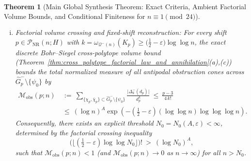 \documentclass[11pt, a4paper]{article}
\theoremstyle{plain}
\newtheorem{theorem}{Theorem}[section]
\theoremstyle{definition}
\begin{document}
\begin{theorem}[Main Global Synthesis Theorem: Exact Criteria, Ambient Factorial Volume Bounds, and Conditional Finiteness for $n\equiv1\pmod{24}$]
\begin{enumerate}[(a)]
\begin{enumerate}[(i)]
        \item \emph{Factorial volume crossing and fixed-shift reconstruction:} For every shift $p\in\mathcal{P}_{\mathrm{NR}}(n;H)$ with $k=\omega_{\mathcal{Q}^{-}(n)}(K_p)\ge\big(\frac12-\varepsilon\big)\log\log n$, the exact discrete Bohr--Siegel cross-polytope volume bound (Theorem~\ref{thm:cross_polytope_factorial_law_and_annihilation}(a),(c)) bounds the total normalized measure of all antipodal obstruction cones across $\widehat{G}_p^{-}\setminus\{\psi_0\}$ by
        \begin{equation}\label{eq:main_synthesis_factorial_threshold}
        \begin{split}
        \mathcal{M}_{\mathrm{obs}}(p;n)\ &:=\ \sum_{\{\chi_p,\overline{\chi}_p\}\subset\widehat{G}_p^{-}\setminus\{\psi_0\}}\frac{\big|\Delta_k^{-}(d_p)\big|}{d_p^{k}}\ \le\ \frac{p-3}{4\,k!}\\
        &\le\ (\log n)^{A}\exp\!\left(-\left(\frac12-\varepsilon\right)(\log\log n)\log\log\log n\right).
        \end{split}
        \end{equation}
        Consequently, there exists an explicit threshold $N_0=N_0(A,\varepsilon)<\infty$, determined by the factorial crossing inequality
        \begin{equation}\label{eq:N0_explicit_threshold}
        \big(\lfloor(\tfrac12-\varepsilon)\log\log N_0\rfloor\big)!\ >\ (\log N_0)^{A},
        \end{equation}
        such that $\mathcal{M}_{\mathrm{obs}}(p;n)<1$ (and $\mathcal{M}_{\mathrm{obs}}(p;n)\to 0$ as $n\to\infty$) for all $n>N_0$.


\end{enumerate}
\end{enumerate}
\end{theorem}
\end{document}
